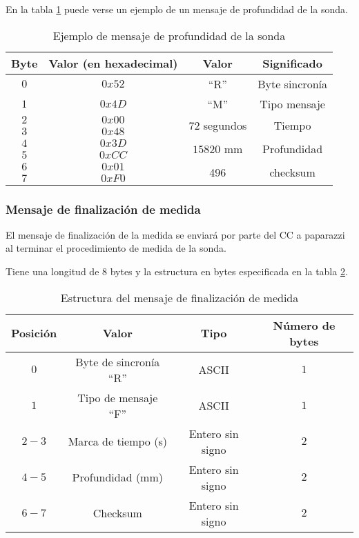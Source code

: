 En la tabla \ref{tab11} puede verse un ejemplo de un mensaje de profundidad de la sonda.

\begin{table}[h]
	\centering
	\caption{Ejemplo de mensaje de profundidad de la sonda}
	\begin{tabular}{|c|c|c|c|}\hline
		\textbf{Byte} 	&	\textbf{Valor (en hexadecimal)}	&\textbf{Valor}	&\textbf{Significado} \\ \hline \hline
		$0$ 			&  $0x52$			& ``R''	& Byte sincronía	\\ \hline
		$1$				&  $0x4D$			& ``M''	& Tipo mensaje		\\ \hline
		$2$				&  $0x00$			& \multirow{2}{*}{$72$ segundos} & \multirow{2}{*}{Tiempo} \\
		$3$				&  $0x48$			&  & \\ \hline	
		$4$				&  $0x3D$			& \multirow{2}{*}{$15820$ mm} & \multirow{2}{*}{Profundidad} \\
		$5$				&  $0xCC$			&  & \\ \hline	
		$6$				&  $0x01$			&  \multirow{2}{*}{496}	& \multirow{2}{*}{checksum} \\
		$7$				&  $0xF0$			&     &     \\ \hline	
		
		
	\end{tabular}
	\label{tab11}
\end{table}


\subsubsection{Mensaje de finalización de medida}

El mensaje de finalización de la medida se enviará por parte del CC a paparazzi al terminar el procedimiento de medida de la sonda.

Tiene una longitud de $8$ bytes y la estructura en bytes especificada en la tabla \ref{tab12}.

\begin{table}[h]
	\centering
	\caption{Estructura del mensaje  de finalización de medida}
	\begin{tabular}{|c|c|c|c|}\hline 
		\textbf{Posición}	& \textbf{Valor} & \textbf{Tipo} &\textbf{Número de bytes} \\ \hline \hline 
		$0$		& Byte de sincronía ``R''				& ASCII	 			&	$1$ \\  \hline
		$1$		& Tipo de mensaje ``F''				& ASCII	 			&	$1$ \\  \hline
		$2-3$	& Marca de tiempo (s)				& Entero sin signo	&   $2$ \\  \hline
		$4-5$	& Profundidad (mm)  				& Entero sin signo	&   $2$ \\  \hline
		$6-7$	& Checksum 							& Entero sin signo	&   $2$ \\  \hline
	\end{tabular}
\label{tab12}
\end{table}

